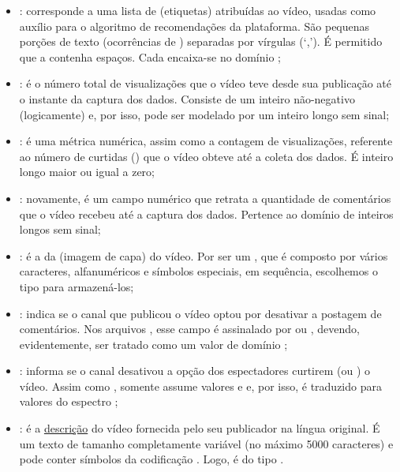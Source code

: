 \begin{itemize}
    \item {}: corresponde a uma lista de  (etiquetas) atribuídas ao vídeo, usadas como auxílio para o algoritmo de recomendações da plataforma. São pequenas porções de texto (ocorrências de ) separadas por vírgulas (`,'). É permitido que a  contenha espaços. Cada  encaixa-se no domínio ;
    \item {}: é o número total de visualizações que o vídeo teve desde sua publicação até o instante da captura dos dados. Consiste de um inteiro não-negativo (logicamente) e, por isso, pode ser modelado por um inteiro longo sem sinal;
    \item {}: é uma métrica numérica, assim como a contagem de visualizações, referente ao número de curtidas () que o vídeo obteve até a coleta dos dados. É inteiro longo maior ou igual a zero;
    \item {}: novamente, é um campo numérico que retrata a quantidade de comentários que o vídeo recebeu até a captura dos dados. Pertence ao domínio de inteiros longos sem sinal;
    \item {}: é a  da  (imagem de capa) do vídeo. Por ser um , que é composto por vários caracteres, alfanuméricos e símbolos especiais, em sequência, escolhemos o tipo  para armazená-los;
    \item {}: indica se o canal que publicou o vídeo optou por desativar a postagem de comentários. Nos arquivos , esse campo é assinalado por  ou , devendo, evidentemente, ser tratado como um valor de domínio ;
    \item {}: informa se o canal desativou a opção dos espectadores curtirem (ou ) o vídeo. Assim como , somente assume valores  e  e, por isso, é traduzido para valores do espectro ;
    \item {}: é a \href{https://developers.google.com/youtube/v3/docs/videos?hl=pt-br#snippet.description}{descrição} do vídeo fornecida pelo seu publicador na língua original. É um texto de tamanho completamente variável (no máximo 5000 caracteres) e pode conter símbolos da codificação . Logo, é do tipo .

\end{itemize}
